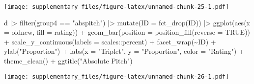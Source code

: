\documentclass[
  man,floatsintext]{apa7}
\newenvironment{Shaded}{\begin{snugshade}}{\end{snugshade}}
\newcommand{\AttributeTok}[1]{\textcolor[rgb]{0.77,0.63,0.00}{#1}}
\newcommand{\ConstantTok}[1]{\textcolor[rgb]{0.00,0.00,0.00}{#1}}
\newcommand{\FunctionTok}[1]{\textcolor[rgb]{0.00,0.00,0.00}{#1}}
\newcommand{\NormalTok}[1]{#1}
\newcommand{\SpecialCharTok}[1]{\textcolor[rgb]{0.00,0.00,0.00}{#1}}
\newcommand{\StringTok}[1]{\textcolor[rgb]{0.31,0.60,0.02}{#1}}
\begin{document}
\texttt{[image: supplementary\_files/figure-latex/unnamed-chunk-25-1.pdf]}

\begin{Shaded}
\begin{Highlighting}[]
\NormalTok{d }\SpecialCharTok{|\textgreater{}}
  \FunctionTok{filter}\NormalTok{(group4 }\SpecialCharTok{==} \StringTok{"abspitch"}\NormalTok{) }\SpecialCharTok{|\textgreater{}}
  \FunctionTok{mutate}\NormalTok{(}\AttributeTok{ID =} \FunctionTok{fct\_drop}\NormalTok{(ID)) }\SpecialCharTok{|\textgreater{}}
  \FunctionTok{ggplot}\NormalTok{(}\FunctionTok{aes}\NormalTok{(}\AttributeTok{x =}\NormalTok{ oldnew, }\AttributeTok{fill =}\NormalTok{ rating)) }\SpecialCharTok{+}
  \FunctionTok{geom\_bar}\NormalTok{(}\AttributeTok{position =} \FunctionTok{position\_fill}\NormalTok{(}\AttributeTok{reverse =} \ConstantTok{TRUE}\NormalTok{)) }\SpecialCharTok{+}
  \FunctionTok{scale\_y\_continuous}\NormalTok{(}\AttributeTok{labels =}\NormalTok{ scales}\SpecialCharTok{::}\NormalTok{percent) }\SpecialCharTok{+}
  \FunctionTok{facet\_wrap}\NormalTok{(}\SpecialCharTok{\textasciitilde{}}\NormalTok{ID) }\SpecialCharTok{+}
  \FunctionTok{ylab}\NormalTok{(}\StringTok{"Proportion"}\NormalTok{) }\SpecialCharTok{+}
  \FunctionTok{labs}\NormalTok{(}\AttributeTok{x =} \StringTok{"Triplet"}\NormalTok{, }\AttributeTok{y =} \StringTok{"Proportion"}\NormalTok{, }\AttributeTok{color =} \StringTok{"Rating"}\NormalTok{) }\SpecialCharTok{+}
  \FunctionTok{theme\_clean}\NormalTok{() }\SpecialCharTok{+}
  \FunctionTok{ggtitle}\NormalTok{(}\StringTok{"Absolute Pitch"}\NormalTok{)}
\end{Highlighting}
\end{Shaded}

\texttt{[image: supplementary\_files/figure-latex/unnamed-chunk-26-1.pdf]}
\end{document}
